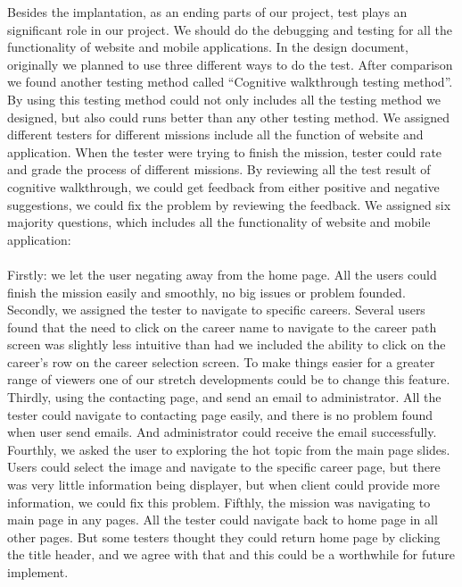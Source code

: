 \documentclass[onecolumn, draftclsnofoot,10pt, compsoc]{IEEEtran}
\begin{document}
\noindent Besides the implantation, as an ending parts of our project, test plays an significant role in our project. We should do the debugging and testing for all the functionality of website and mobile applications. In the design document, originally we planned to use three different ways to do the test. After comparison we found another testing method called “Cognitive walkthrough testing method”. By using this testing method could not only includes all the testing method we designed, but also could runs better than any other testing method. We assigned different testers for different missions include all the function of website and application. When the tester were trying to finish the mission, tester could rate and grade the process of different missions. By reviewing all the test result of cognitive walkthrough, we could get feedback from either positive and negative suggestions, we could fix the problem by reviewing the feedback. 
We assigned six majority questions, which includes all the functionality of website and mobile application:
\\ \\
\noindent Firstly: we let the user negating away from the home page. All the users could finish the mission easily and smoothly, no big issues or problem founded. 
Secondly, we assigned the tester to navigate to specific careers. Several users found that the need to click on the career name to navigate to the career path screen was slightly less intuitive than had we included the ability to click on the career’s row on the career selection screen. To make things easier for a greater range of viewers one of our stretch developments could be to change this feature.
Thirdly, using the contacting page, and send an email to administrator. All the tester could navigate to contacting page easily, and there is no problem found when user send emails. And administrator could receive the email successfully. 
Fourthly, we asked the user to exploring the hot topic from the main page slides. Users could select the image and navigate to the specific career page, but there was very little information being displayer, but when client could provide more information, we could fix this problem. 
Fifthly, the mission was navigating to main page in any pages. All the tester could navigate back to home page in all other pages. But some testers thought they could return home page by clicking the title header, and we agree with that and this could be a worthwhile for future implement.\\
\end{document}
